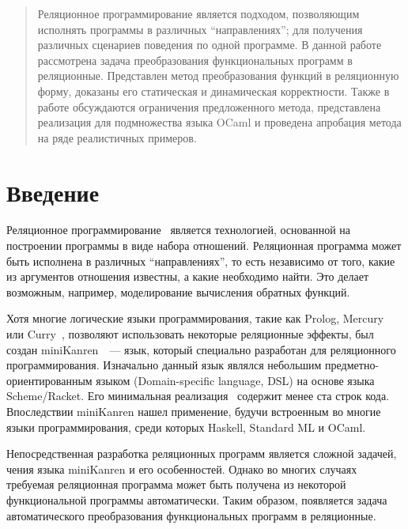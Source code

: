 \maketitle

\begin{abstract}
Реляционное программирование является подходом, позволяющим исполнять программы в различных ``направлениях''; для получения различных сценариев поведения по одной программе.
В данной работе рассмотрена задача преобразования функциональных программ в реляционные.
Представлен метод преобразования функций в реляционную форму, доказаны его статическая и динамическая корректности.
Также в работе обсуждаются ограничения предложенного метода, представлена реализация для подмножества языка OCaml и проведена апробация метода на ряде реалистичных примеров.
\end{abstract}

\section{Введение}
Реляционное программирование~\cite{lozov-spbu:TheReasonedSchemer} является технологией, основанной на построении программы в виде набора отношений. Реляционная программа может быть исполнена в различных  ``направлениях'', то есть независимо от того, какие из аргументов отношения известны, а какие необходимо найти. Это делает возможным, например, моделирование вычисления обратных функций.

Хотя многие логические языки программирования, такие как Prolog, Mercury~\cite{lozov-spbu:Mercury} или Curry~\cite{lozov-spbu:Curry}, позволяют использовать некоторые реляционные эффекты, был создан miniKanren~\cite{lozov-spbu:mkanren}~--- язык, который специально разработан для реляционного программирования. Изначально данный язык являлся небольшим предметно-ориентированным языком (Domain-specific language, DSL) на основе языка Scheme/Racket. Его минимальная реализация~\cite{lozov-spbu:implementation} содержит менее ста строк кода. Впоследствии miniKanren нашел применение, будучи встроенным во многие языки программирования, среди которых Haskell, Standard ML и OCaml.

Непосредственная разработка реляционных программ является сложной задачей,
чения языка miniKanren и его особенностей. Однако во многих случаях требуемая реляционная программа может быть получена из некоторой функциональной программы автоматически. Таким образом, появляется задача автоматического преобразования функциональных программ в реляционные.

